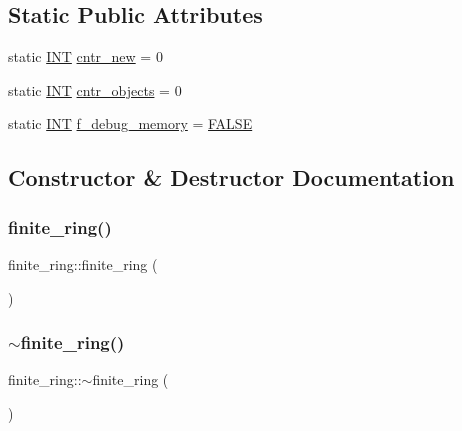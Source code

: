 \subsection*{Static Public Attributes}
\begin{DoxyCompactItemize}
\item 
static \mbox{\hyperlink{galois_8h_a09fddde158a3a20bd2dcadb609de11dc}{I\+NT}} \mbox{\hyperlink{classfinite__ring_a15c54be5e8125b13a788284bea253f39}{cntr\+\_\+new}} = 0
\item 
static \mbox{\hyperlink{galois_8h_a09fddde158a3a20bd2dcadb609de11dc}{I\+NT}} \mbox{\hyperlink{classfinite__ring_a2b6bbc19dc2c200928e3e755659ce82c}{cntr\+\_\+objects}} = 0
\item 
static \mbox{\hyperlink{galois_8h_a09fddde158a3a20bd2dcadb609de11dc}{I\+NT}} \mbox{\hyperlink{classfinite__ring_a57367d67ee858e9b7ae80a83bcb2ed14}{f\+\_\+debug\+\_\+memory}} = \mbox{\hyperlink{nauty_8h_aa93f0eb578d23995850d61f7d61c55c1}{F\+A\+L\+SE}}
\end{DoxyCompactItemize}


\subsection{Constructor \& Destructor Documentation}
\mbox{\label{classfinite__ring_a3dfb141013709944f0eb8b03aee1b9c3}} 
\subsubsection{\texorpdfstring{finite\+\_\+ring()}{finite\_ring()}}
{\footnotesize\ttfamily finite\+\_\+ring\+::finite\+\_\+ring (\begin{DoxyParamCaption}{ }\end{DoxyParamCaption})}

\mbox{\label{classfinite__ring_ac75353244c3c4640ba44db9bc20a6297}} 
\subsubsection{\texorpdfstring{$\sim$finite\+\_\+ring()}{~finite\_ring()}}
{\footnotesize\ttfamily finite\+\_\+ring\+::$\sim$finite\+\_\+ring (\begin{DoxyParamCaption}{ }\end{DoxyParamCaption})}



